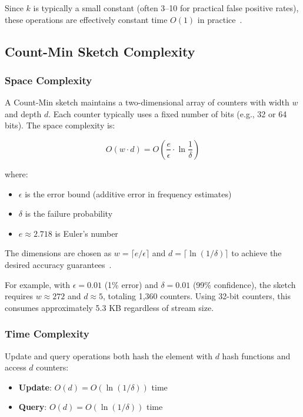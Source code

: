 Since $k$ is typically a small constant (often 3--10 for practical false positive rates), these operations are effectively constant time $O(1)$ in practice~\cite{bloom1970space}.

\subsection{Count-Min Sketch Complexity}

\subsubsection{Space Complexity}

A Count-Min sketch maintains a two-dimensional array of counters with width $w$ and depth $d$. Each counter typically uses a fixed number of bits (e.g., 32 or 64 bits). The space complexity is:

\begin{equation}
O(w \cdot d) = O\left(\frac{e}{\epsilon} \cdot \ln \frac{1}{\delta}\right)
\end{equation}

where:
\begin{itemize}
    \item $\epsilon$ is the error bound (additive error in frequency estimates)
    \item $\delta$ is the failure probability
    \item $e \approx 2.718$ is Euler's number
\end{itemize}

The dimensions are chosen as $w = \lceil e/\epsilon \rceil$ and $d = \lceil \ln(1/\delta) \rceil$ to achieve the desired accuracy guarantees~\cite{cormode2005improved}.

For example, with $\epsilon = 0.01$ (1\% error) and $\delta = 0.01$ (99\% confidence), the sketch requires $w \approx 272$ and $d \approx 5$, totaling 1,360 counters. Using 32-bit counters, this consumes approximately 5.3 KB regardless of stream size.

\subsubsection{Time Complexity}

Update and query operations both hash the element with $d$ hash functions and access $d$ counters:

\begin{itemize}
    \item \textbf{Update}: $O(d) = O(\ln(1/\delta))$ time
    \item \textbf{Query}: $O(d) = O(\ln(1/\delta))$ time
\end{itemize}

